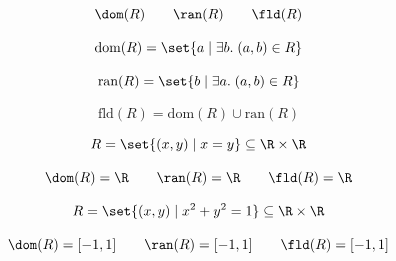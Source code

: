 
\begin{frame}{}
  \begin{center}
    \[
      \dom(R) \qquad \ran(R) \qquad \fld(R)
    \]
  \end{center}
\end{frame}

\begin{frame}{}
  \begin{definition}
    \[
      \text{dom}(R) = \set{a \mid \exists b.\; (a,b) \in R}
    \]
  \end{definition}

  \pause
  \vspace{0.80cm}
  \begin{definition}[值域 (Range)]
    \[
      \text{ran}(R) = \set{b \mid \exists a.\; (a,b) \in R}
    \]
  \end{definition}

  \pause
  \vspace{0.80cm}
  \begin{definition}[域 (Field)]
    \[
      \text{fld}(R) = \text{dom}(R) \cup \text{ran}(R)
    \]
  \end{definition}
\end{frame}

\begin{frame}{}
  \[
    R = \set{(x, y) \mid x = y} \subseteq \R \times \R
  \]

  \pause
  \[
    \dom(R) = \R \qquad \ran(R) = \R \qquad \fld(R) = \R
  \]
\end{frame}

\begin{frame}{}
  \[
    R = \set{(x, y) \mid x^2 + y^2 = 1} \subseteq \R \times \R
  \]

  \pause
  \[
    \dom(R) = [-1, 1] \qquad \ran(R) = [-1, 1] \qquad \fld(R) = [-1, 1]
  \]
\end{frame}


